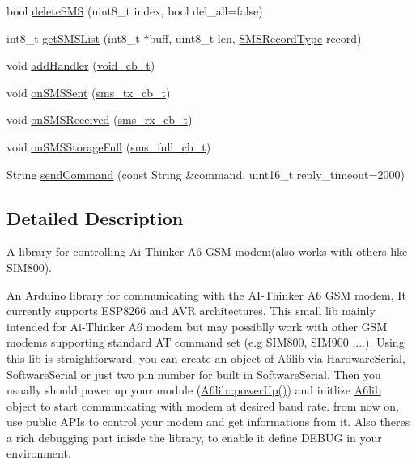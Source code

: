 \begin{DoxyCompactItemize}
\item 
bool \mbox{\hyperlink{class_a6lib_acb407d54e8ab25e7549b721ef090c686}{delete\+S\+MS}} (uint8\+\_\+t index, bool del\+\_\+all=false)
\item 
int8\+\_\+t \mbox{\hyperlink{class_a6lib_ac6c57bc2707d968d2ce6c55bdcf22c0c}{get\+S\+M\+S\+List}} (int8\+\_\+t $\ast$buff, uint8\+\_\+t len, \mbox{\hyperlink{_a6lib_8h_a810fca4a55c1c8a606d12c63ed21e041}{S\+M\+S\+Record\+Type}} record)
\item 
void \mbox{\hyperlink{class_a6lib_ab9580c0720252ad9e2d6b67683e3e88f}{add\+Handler}} (\mbox{\hyperlink{_a6lib_8h_a7a1b65425109a6c0a0d203c1fe9bbbe5}{void\+\_\+cb\+\_\+t}})
\item 
void \mbox{\hyperlink{class_a6lib_ac92651260eaefe715ed1e1dc798fa275}{on\+S\+M\+S\+Sent}} (\mbox{\hyperlink{_a6lib_8h_a7b74957a5e4992ea4364e91c175b5d7d}{sms\+\_\+tx\+\_\+cb\+\_\+t}})
\item 
void \mbox{\hyperlink{class_a6lib_a9503f1167ed6fd225aee3086b827803d}{on\+S\+M\+S\+Received}} (\mbox{\hyperlink{_a6lib_8h_a0c0c0674e9fa2ea70a4a13b38abdc0f9}{sms\+\_\+rx\+\_\+cb\+\_\+t}})
\item 
void \mbox{\hyperlink{class_a6lib_ac254b0457036a93d83e1a6fc296f57a0}{on\+S\+M\+S\+Storage\+Full}} (\mbox{\hyperlink{_a6lib_8h_a97f6ff1cf1ed894d22d58ebdb05b8bbf}{sms\+\_\+full\+\_\+cb\+\_\+t}})
\item 
String \mbox{\hyperlink{class_a6lib_a934e8451ed2125f0fee5bc720a99ed91}{send\+Command}} (const String \&command, uint16\+\_\+t reply\+\_\+timeout=2000)
\end{DoxyCompactItemize}


\subsection{Detailed Description}
A library for controlling Ai-\/\+Thinker A6 G\+SM modem(also works with others like S\+I\+M800). 

An Arduino library for communicating with the A\+I-\/\+Thinker A6 G\+SM modem, It currently supports E\+S\+P8266 and A\+VR architectures. This small lib mainly intended for Ai-\/\+Thinker A6 modem but may possiblly work with other G\+SM modems supporting standard AT command set (e.\+g S\+I\+M800, S\+I\+M900 ,...). Using this lib is straightforward, you can create an object of \mbox{\hyperlink{class_a6lib}{A6lib}} via Hardware\+Serial, Software\+Serial or just two pin number for built in Software\+Serial. Then you usually should power up your module (\mbox{\hyperlink{class_a6lib_add46e8926e5809cc7e33a7ad2817fcc5}{A6lib\+::power\+Up()}}) and initlize \mbox{\hyperlink{class_a6lib}{A6lib}} object to start communicating with modem at desired baud rate. from now on, use public A\+P\+Is to control your modem and get informations from it. Also there\textquotesingle{}s a rich debugging part inisde the library, to enable it define D\+E\+B\+UG in your environment.

